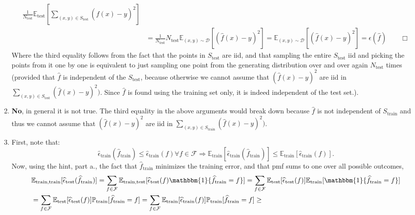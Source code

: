 \documentclass{article}
\newcommand{\1}{\mathbf{1}}
\newcommand{\I}{\mathbbm{1}}
\newcommand{\E}{\mathbb{E}}
\renewcommand{\P}{\mathbb{P}}
\begin{document}
\begin{enumerate}
\begin{align*}
        \frac{1}{N_{\text{test}}} \E_{\text{test}}\left[\sum_{(x,y)\in S_{\text{test}}} (\widehat{f}(x)-y)^2\right]  \\
        &= \frac{1}{N_{\text{test}}} N_{\text{test}} \E_{(x,y)\sim\mathcal{D}}[ (\widehat{f}(x) - y)^2 ] =  \E_{(x,y)\sim\mathcal{D}}[ (\widehat{f}(x) - y)^2 ] = \epsilon(\widehat{f})\qquad \Box
        \end{align*}
        Where the third equality follows from the fact that the points in $S_{\text{test}}$ are iid, and that sampling the entire $S_{\text{test}}$ iid and picking the points from it one by one is equivalent to just sampling one point from the generating distribution over and over again $N_{\text{test}}$ times (provided that $\widehat{f}$ is independent of the $S_{\text{test}}$, because otherwise we cannot assume that $(\widehat{f}(x) - y)^2$ are iid in $\sum_{(x,y)\in S_{\text{test}}} (\widehat{f}(x)-y)^2)$. Since $\widehat{f}$ is found using the training set only, it is indeed independent of the test set.).
    \item {\bf No}, in general it is not true. The third equality in the above arguments would break down because $\widehat{f}$ is not independent of $S_{\text{train}}$ and thus we cannot assume that $(\widehat{f}(x) - y)^2$ are iid in $\sum_{(x,y)\in S_{\text{train}}} (\widehat{f}(x)-y)^2)$. 
    \item First, note that: 
    $$
     \widehat\epsilon_{\text{train}}(\widehat{f}_{\text{train}}) \leq \widehat\epsilon_{\text{train}}(f) \forall f\in\mathcal{F} \Rightarrow \E_{\text{train}}[ \widehat\epsilon_{\text{train}}(\widehat{f}_{\text{train}}) ] \le \E_{\text{train}}[ \widehat\epsilon_{\text{train}}(f) ] .
    $$
    Now, using the hint, part a., the fact that $\widehat{f}_\text{train}$ minimizes the training error, and that pmf sums to one over all possible outcomes, 
            \begin{align*}
                &\E_{\text{train,train}}[ \widehat\epsilon_{\text{test}}(\widehat{f}_{\text{train}}) ] 
                = \sum_{f\in\mathcal{F}} \E_{\text{train,test}}[ \widehat\epsilon_{\text{test}}(f) \I\{ \widehat{f}_{\text{train}} = f \} ] 
                = \sum_{f\in\mathcal{F}} \E_{\text{test}}[ \widehat\epsilon_{\text{test}}(f)] \E_{\text{train}}[\I\{ \widehat{f}_{\text{train}} = f \} ]
                \\
                &= \sum_{f\in\mathcal{F}} \E_{\text{test}}[ \widehat\epsilon_{\text{test}}(f)] \P_{\text{train}}[\widehat{f}_{\text{train}} = f ]
                = \sum_{f\in\mathcal{F}} \E_{\text{train}}[ \widehat\epsilon_{\text{train}}(f) ] \P_{\text{train}}[\widehat{f}_{\text{train}} = f ] \ge

\end{align*}
\end{enumerate}
\end{document}
